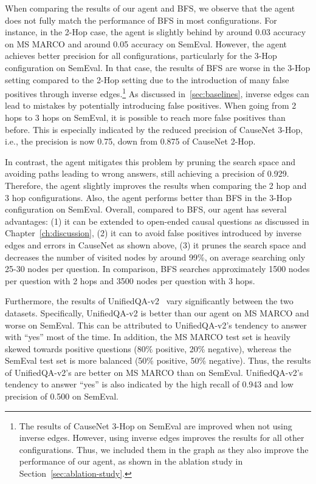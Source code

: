 When comparing the results of our agent and BFS, we observe that the agent does not fully match the performance of BFS in most configurations.
For instance, in the 2-Hop case, the agent is slightly behind by around 0.03 accuracy on MS MARCO and around 0.05 accuracy on SemEval.
However, the agent achieves better precision for all configurations, particularly for the 3-Hop configuration on SemEval.
In that case, the results of BFS are worse in the 3-Hop setting compared to the 2-Hop setting due to the 
 introduction of many false positives through inverse edges.\footnote{The results of CauseNet 3-Hop on SemEval are improved when not using inverse edges. However, using inverse edges improves the results for all other configurations. Thus, we included them in the graph as they also improve the performance of our agent, as shown in the ablation study in Section~\ref{sec:ablation-study}.} 
As discussed in~\ref{sec:baselines}, inverse edges can lead to mistakes by potentially introducing false positives.
When going from 2 hops to 3 hops on SemEval, it is possible to reach more false positives than before. 
This is especially indicated by the reduced precision of CauseNet 3-Hop, i.e., the precision is now 0.75, down from 0.875 of CauseNet 2-Hop.

In contrast, the agent mitigates this problem by pruning the search space and avoiding paths leading to wrong answers, still achieving a precision of 0.929.
Therefore, the agent slightly improves the results when comparing the 2 hop and 3 hop configurations. Also, the agent performs better than 
BFS in the 3-Hop configuration on SemEval.
Overall, compared to BFS, our agent has several advantages:
(1) it can be extended to open-ended causal questions as discussed in Chapter~\ref{ch:discussion},
(2) it can to avoid false positives introduced by inverse edges and errors in CauseNet as shown above,
(3) it prunes the search space and
decreases the number of visited nodes by around 99\%, on average searching only 25-30 nodes per question.
In comparison, BFS searches approximately 1500 nodes per question with 2 hops and 3500 nodes per question with 3 hops.

Furthermore, the results of UnifiedQA-v2~\cite{Khashabi2020UnifiedQA, Khashabi2022UnifiedQA2} vary significantly between the two datasets. 
Specifically, UnifiedQA-v2 is better than our agent on MS MARCO and worse on SemEval.
This can be attributed to UnifiedQA-v2's tendency to answer with ``yes'' most of the time. 
In addition, the MS MARCO test set is heavily skewed towards positive questions (80\% positive, 20\% negative), whereas the SemEval test set is more balanced (50\% positive, 50\% negative).
Thus, the results of UnifiedQA-v2's are better on MS MARCO than on SemEval.
 UnifiedQA-v2's tendency to answer ``yes'' is also indicated by the high recall of 0.943 and low precision of 0.500 on SemEval.


